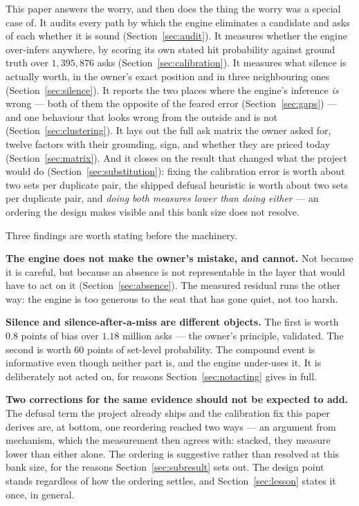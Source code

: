 \documentclass[11pt]{article}
\begin{document}
This paper answers the worry, and then does the thing the worry was a special case of. It
audits every path by which the engine eliminates a candidate and asks of each whether it
is sound (Section~\ref{sec:audit}). It measures whether the engine over-infers anywhere,
by scoring its own stated hit probability against ground truth over $1{,}395{,}876$ asks
(Section~\ref{sec:calibration}). It measures what silence is actually worth, in the
owner's exact position and in three neighbouring ones (Section~\ref{sec:silence}). It
reports the two places where the engine's inference \emph{is} wrong --- both of them the
opposite of the feared error (Section~\ref{sec:gaps}) --- and one behaviour that looks
wrong from the outside and is not (Section~\ref{sec:clustering}). It lays out the full
ask matrix the owner asked for, twelve factors with their grounding, sign, and whether
they are priced today (Section~\ref{sec:matrix}). And it closes on the result that
changed what the project would do (Section~\ref{sec:substitution}): fixing the
calibration error is worth about two sets per duplicate pair, the shipped defusal
heuristic is worth about two sets per duplicate pair, and \emph{doing both measures lower
than doing either} --- an ordering the design makes visible and this bank size does not
resolve.

Three findings are worth stating before the machinery.

\textbf{The engine does not make the owner's mistake, and cannot.} Not because it is
careful, but because an absence is not representable in the layer that would have to act
on it (Section~\ref{sec:absence}). The measured residual runs the other way: the engine
is too generous to the seat that has gone quiet, not too harsh.

\textbf{Silence and silence-after-a-miss are different objects.} The first is worth
$0.8$ points of bias over $1.18$ million asks --- the owner's principle, validated. The
second is worth $60$ points of set-level probability. The compound event is informative
even though neither part is, and the engine under-uses it. It is deliberately not acted
on, for reasons Section~\ref{sec:notacting} gives in full.

\textbf{Two corrections for the same evidence should not be expected to add.} The defusal
term the project already ships \cite{concession} and the calibration fix this paper derives
are, at bottom, one reordering reached two ways --- an argument from mechanism, which the
measurement then agrees with: stacked, they measure lower than either alone. The ordering
is suggestive rather than resolved at this bank size, for the reasons
Section~\ref{sec:subresult} sets out. The design point stands regardless of how the
ordering settles, and Section~\ref{sec:lesson} states it once, in general.
\end{document}
